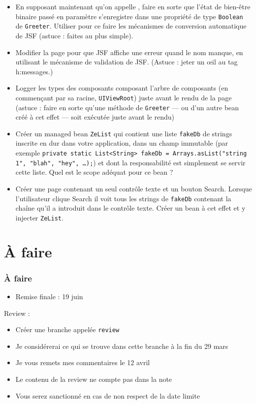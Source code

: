 \documentclass[english, french]{beamer}
\begin{document}
\begin{frame}[allowframebreaks]
\begin{itemize}
		\item En supposant maintenant qu’on appelle , faire en sorte que l’état de bien-être binaire passé en paramètre s’enregistre dans une propriété de type \texttt{Boolean} de \texttt{Greeter}. Utiliser pour ce faire les mécanismes de conversion automatique de JSF {\tiny (astuce : faites au plus simple)}.
		\item Modifier la page pour que JSF affiche une erreur quand le nom manque, en utilisant le mécanisme de validation de JSF. {\tiny (Astuce : jeter un œil au tag h:messages.)}%
		\item Logger les types des composants composant l’arbre de composants (en commençant par sa racine, \texttt{UIViewRoot}) juste avant le rendu de la page {\tiny (astuce : faire en sorte qu’une méthode de \texttt{Greeter} — ou d’un autre bean créé à cet effet — soit exécutée juste avant le rendu)}
		\item Créer un managed bean \texttt{ZeList} qui contient une liste \texttt{fakeDb} de strings inscrite en dur dans votre application, dans un champ immutable (par exemple \texttt{private static List<String> fakeDb = Arrays.asList("string 1", "blah", "hey", …);}) et dont la responsabilité est simplement se servir cette liste. Quel est le scope adéquat pour ce bean ?
		\item Créer une page  contenant un seul contrôle texte et un bouton Search. Lorsque l’utilisateur clique Search il voit tous les strings de \texttt{fakeDb} contenant la chaîne qu’il a introduit dans le contrôle texte. Créer un bean à cet effet et y injecter \texttt{ZeList}.
	\end{itemize}
\end{frame}

\section{À faire}
\begin{frame}
	\frametitle{À faire}
	
	\begin{itemize}
		\item Remise finale : 19 juin
	\end{itemize}
	Review :
	\begin{itemize}
		\item Créer une branche appelée \texttt{review}
		\item Je considérerai ce qui se trouve dans cette branche à la fin du 29 mars
		\item Je vous remets mes commentaires le 12 avril
		\item Le contenu de la review ne compte pas dans la note
		\item Vous serez sanctionné en cas de non respect de la date limite
	\end{itemize}
\end{frame}
\end{document}
